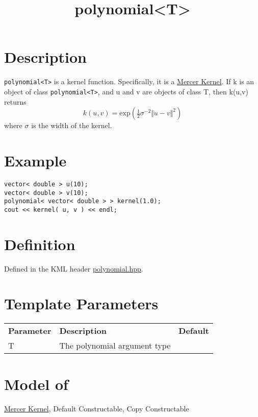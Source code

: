 \documentclass{article}
\newcommand{\half}{\tfrac{1}{2}}
\begin{document}
\title{polynomial<T>}
\maketitle

\section*{Description}

\texttt{polynomial<T>} is a kernel function. Specifically, it is a \href{research/kml/documentation/mercer_kernel.html}{Mercer Kernel}.
 If k is an object of class \texttt{polynomial<T>}, and u and v are objects of class T, then k(u,v) returns
%
$$k(u,v) = \textrm{exp}( \half \sigma^{-2} \Vert u-v \Vert^2 ) $$
%
where $\sigma$ is the width of the kernel. 


\section*{Example}


\highlightcpp{}
\begin{verbatim}
vector< double > u(10);
vector< double > v(10);
polynomial< vector< double > > kernel(1.0);
cout << kernel( u, v ) << endl;
\end{verbatim}


\section*{Definition}

Defined in the KML header \href{polynomial.hpp}{polynomial.hpp}.


\section*{Template Parameters}

\begin{tabular}{lll}
\textbf{Parameter} & \textbf{Description} & \textbf{Default} \\ 
T & The polynomial argument type \\ 
\end{tabular}


\section*{Model of}

\href{research/kml/documentation/mercer_kernel.html}{Mercer Kernel}, 
Default Constructable, Copy Constructable
\end{document}
